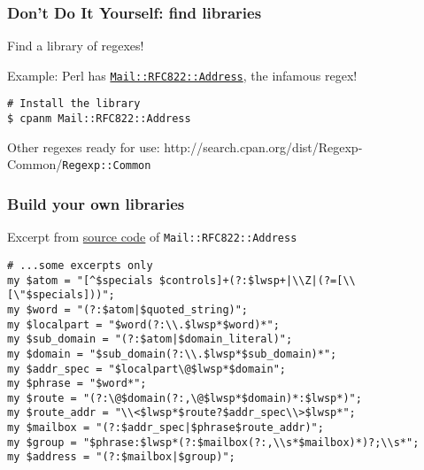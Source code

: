 \begin{frame}[fragile]
  \frametitle{Don't Do It Yourself: find libraries}

  Find a library of regexes!

  Example: Perl has \href{http://search.cpan.org/~pdwarren/Mail-RFC822-Address-0.3/Address.pm}{\texttt{Mail::RFC822::Address}}, the infamous regex!

  \begin{verbatim}
# Install the library
$ cpanm Mail::RFC822::Address
  \end{verbatim}

  Other regexes ready for use: {http://search.cpan.org/dist/Regexp-Common/}{\texttt{Regexp::Common}}
\end{frame}

%

\begin{frame}[fragile]
  \frametitle{Build your own libraries}

  Excerpt from \href{http://cpansearch.perl.org/src/PDWARREN/Mail-RFC822-Address-0.3/Address.pm}{source code} of \texttt{Mail::RFC822::Address}

  \begin{verbatim}
# ...some excerpts only
my $atom = "[^$specials $controls]+(?:$lwsp+|\\Z|(?=[\\[\"$specials]))";
my $word = "(?:$atom|$quoted_string)";
my $localpart = "$word(?:\\.$lwsp*$word)*";
my $sub_domain = "(?:$atom|$domain_literal)";
my $domain = "$sub_domain(?:\\.$lwsp*$sub_domain)*";
my $addr_spec = "$localpart\@$lwsp*$domain";
my $phrase = "$word*";
my $route = "(?:\@$domain(?:,\@$lwsp*$domain)*:$lwsp*)";
my $route_addr = "\\<$lwsp*$route?$addr_spec\\>$lwsp*";
my $mailbox = "(?:$addr_spec|$phrase$route_addr)";
my $group = "$phrase:$lwsp*(?:$mailbox(?:,\\s*$mailbox)*)?;\\s*";
my $address = "(?:$mailbox|$group)";
  \end{verbatim}
\end{frame}

